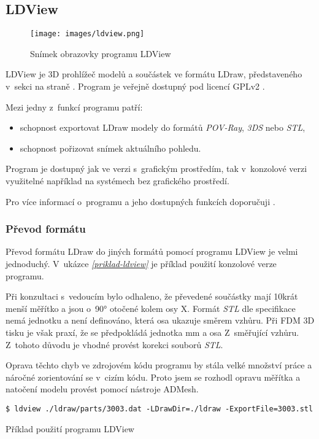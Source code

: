 \subsection{LDView}\label{podsekce-ldview}
\begin{figure}[htbp]
        \centering
        \texttt{[image: images/ldview.png]}
        \caption{Snímek obrazovky programu LDView}
\end{figure}

LDView je 3D prohlížeč modelů a součástek ve formátu LDraw, představeného v~sekci \emph{} na straně \emph{\pageref{ldraw-format}}. Program je veřejně dostupný pod licencí \gls{GPLv2} \autocite{GPLv2}.

Mezi jedny z~funkcí programu patří: 
\begin{itemize}
    \item schopnost exportovat LDraw modely do formátů \textit{POV-Ray}, \textit{3DS} nebo \textit{STL},
    \item schopnost pořizovat snímek aktuálního pohledu.
\end{itemize}

Program je dostupný jak ve verzi s~grafickým prostředím, tak v~konzolové verzi využitelné například na systémech bez grafického prostředí.

Pro více informací o~programu a jeho dostupných funkcích doporučuji \autocite{ldview}.

\subsubsection*{Převod formátu}

Převod formátu LDraw do jiných formátů pomocí programu LDView je velmi jednoduchý. V~ukázce \emph{\ref{priklad-ldview}} je příklad použití konzolové verze programu. 

Při konzultaci s~vedoucím bylo odhaleno, že převedené součástky mají 10krát menší měřítko a jsou o~90° otočené kolem osy X. Formát \textit{\gls{STL}} dle specifikace \autocite{stl:specification} nemá jednotku a není definováno, která osa ukazuje směrem vzhůru. Při \gls{FDM} 3D tisku je však praxí, že se předpokládá jednotka mm a osa Z~směřující vzhůru. Z~tohoto důvodu je vhodné provést korekci souborů \textit{STL}.

Oprava těchto chyb ve zdrojovém kódu programu by stála velké množství práce a náročné zorientování se v~cizím kódu. Proto jsem se rozhodl opravu měřítka a natočení modelu provést pomocí nástroje ADMesh. 

 \begin{listing}[htbp]
        \begin{verbatim}
$ ldview ./ldraw/parts/3003.dat -LDrawDir=./ldraw -ExportFile=3003.stl 
        \end{verbatim}
    \caption{Příklad použití programu LDView \label{priklad-ldview}}
\end{listing}



